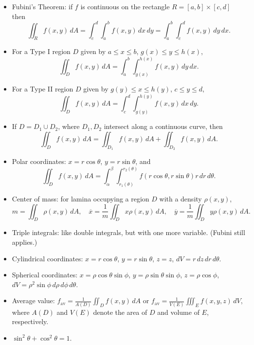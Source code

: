 \documentclass[12pt]{article}
\newcommand{\di}{\displaystyle}
\begin{document}
\begin{itemize}
\item Fubini's Theorem: if $f$ is continuous on the rectangle $R=[a,b]\times[c,d]$ then
\[
\iint_R f(x,y)\,dA = \int_c^d\int_a^bf(x,y)\,dx\,dy = \int_a^b\int_c^d f(x,y)\,dy\,dx.
\]
\item For a Type I region $D$ given by $a\leq x\leq b$, $g(x)\leq y\leq h(x)$,
\[
\iint_D f(x,y)\,dA = \int_a^b\int_{g(x)}^{h(x)}f(x,y)\,dy\,dx.
\]
\item For a Type II region $D$ given by $g(y)\leq x\leq h(y)$, $c\leq y\leq d$,
\[
\iint_D f(x,y)\,dA = \int_c^d\int_{g(y)}^{h(y)}f(x,y)\,dx\,dy.
\]
\item If $D = D_1\cup D_2$, where $D_1,D_2$ intersect along a continuous curve, then
\[
\iint_Df(x,y)\,dA = \iint_{D_1}f(x,y)\,dA + \iint_{D_2}f(x,y)\,dA.
\]
\item Polar coordinates: $x=r\cos\theta$, $y=r\sin\theta$, and
\[
\iint_D f(x,y)\,dA = \int_\alpha^\beta\int_{r_1(\theta)}^{r_2(\theta)}f(r\cos\theta,r\sin\theta)r\,dr\,d\theta.
\]
\item Center of mass: for lamina occupying a region $D$ with a density $\rho(x,y)$,
\[
m = \iint_D\rho(x,y)\,dA,\quad \overline{x} = \frac{1}{m}\iint_D x\rho(x,y)\,dA,\quad \overline{y} = \frac{1}{m}\iint_Dy\rho(x,y)\,dA.
\]
\item Triple integrals: like double integrals, but with one more variable. (Fubini still applies.)
\item Cylindrical coordinates: $x=r\cos\theta$, $y=r\sin\theta$, $z=z$, $dV = r\,dz\,dr\,d\theta$.
\item Spherical coordinates: $x=\rho\cos\theta\sin\phi$, $y=\rho\sin\theta\sin\phi$, $z=\rho\cos\phi$, $dV = \rho^2\sin\phi\,d\rho\,d\phi\,d\theta$.
\item Average value: $\di f_{\mathrm{av}} = \frac{1}{A(D)}\iint_Df(x,y)\,dA$ or $\di f_{\mathrm{av}} = \frac{1}{V(E)}\iiint_Ef(x,y,z)\,dV$, where $A(D)$ and $V(E)$ denote the area of $D$ and volume of $E$, respectively.
\item $\sin^2\theta+\cos^2\theta=1$.
\end{itemize}
\end{document}
